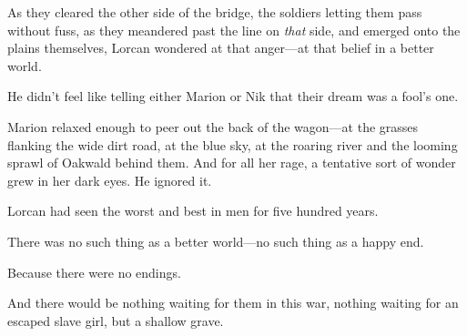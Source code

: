 As they cleared the other side of the bridge, the soldiers letting them pass without fuss, as they meandered past the line on \emph{that} side, and emerged onto the plains themselves, Lorcan wondered at that anger---at that belief in a better world.

He didn't feel like telling either Marion or Nik that their dream was a fool's one.

Marion relaxed enough to peer out the back of the wagon---at the grasses flanking the wide dirt road, at the blue sky, at the roaring river and the looming sprawl of Oakwald behind them. And for all her rage, a tentative sort of wonder grew in her dark eyes. He ignored it.

Lorcan had seen the worst and best in men for five hundred years.

There was no such thing as a better world---no such thing as a happy end.

Because there were no endings.

And there would be nothing waiting for them in this war, nothing waiting for an escaped slave girl, but a shallow grave.
